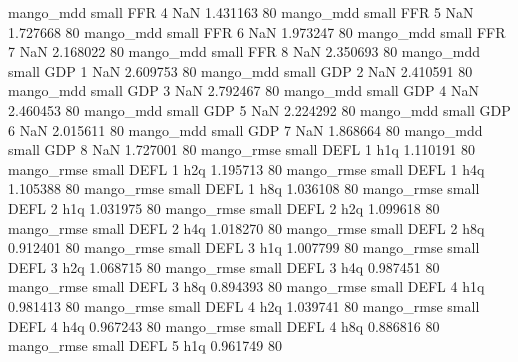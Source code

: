         mango_mdd      small      FFR                 4                  NaN 1.431163 80
        mango_mdd      small      FFR                 5                  NaN 1.727668 80
        mango_mdd      small      FFR                 6                  NaN 1.973247 80
        mango_mdd      small      FFR                 7                  NaN 2.168022 80
        mango_mdd      small      FFR                 8                  NaN 2.350693 80
        mango_mdd      small      GDP                 1                  NaN 2.609753 80
        mango_mdd      small      GDP                 2                  NaN 2.410591 80
        mango_mdd      small      GDP                 3                  NaN 2.792467 80
        mango_mdd      small      GDP                 4                  NaN 2.460453 80
        mango_mdd      small      GDP                 5                  NaN 2.224292 80
        mango_mdd      small      GDP                 6                  NaN 2.015611 80
        mango_mdd      small      GDP                 7                  NaN 1.868664 80
        mango_mdd      small      GDP                 8                  NaN 1.727001 80
       mango_rmse      small     DEFL                 1                  h1q 1.110191 80
       mango_rmse      small     DEFL                 1                  h2q 1.195713 80
       mango_rmse      small     DEFL                 1                  h4q 1.105388 80
       mango_rmse      small     DEFL                 1                  h8q 1.036108 80
       mango_rmse      small     DEFL                 2                  h1q 1.031975 80
       mango_rmse      small     DEFL                 2                  h2q 1.099618 80
       mango_rmse      small     DEFL                 2                  h4q 1.018270 80
       mango_rmse      small     DEFL                 2                  h8q 0.912401 80
       mango_rmse      small     DEFL                 3                  h1q 1.007799 80
       mango_rmse      small     DEFL                 3                  h2q 1.068715 80
       mango_rmse      small     DEFL                 3                  h4q 0.987451 80
       mango_rmse      small     DEFL                 3                  h8q 0.894393 80
       mango_rmse      small     DEFL                 4                  h1q 0.981413 80
       mango_rmse      small     DEFL                 4                  h2q 1.039741 80
       mango_rmse      small     DEFL                 4                  h4q 0.967243 80
       mango_rmse      small     DEFL                 4                  h8q 0.886816 80
       mango_rmse      small     DEFL                 5                  h1q 0.961749 80
